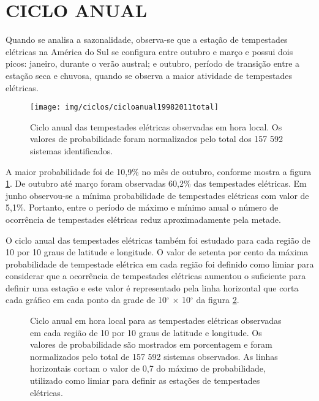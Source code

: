 \section{CICLO ANUAL}
\label{cicloanualsecao}

Quando se analisa a sazonalidade, observa-se que a estação de tempestades elétricas na América do Sul se configura entre outubro e março e possui dois picos: janeiro, durante o verão austral; e outubro, período de transição entre a estação seca e chuvosa, quando se observa a maior atividade de tempestades elétricas. 


\begin{figure}[!h]
\centering
{\texttt{[image: img/ciclos/cicloanual19982011total]}}
\caption{Ciclo anual das tempestades elétricas observadas em hora local. Os valores de probabilidade foram normalizados pelo total dos {157 592} sistemas identificados.}
\label{cicloanualtotal}
\end{figure} 

A maior probabilidade foi de 10,9\%  no mês de outubro, conforme mostra a figura \ref{cicloanualtotal}. De outubro até março foram observadas 60,2\% das tempestades elétricas. Em junho observou-se a mínima probabilidade de tempestades elétricas com valor de 5,1\%. Portanto, entre o período de máximo e mínimo anual o número de ocorrência de tempestades elétricas reduz aproximadamente pela metade.



O ciclo anual das tempestades elétricas também foi estudado para cada região de 10 por 10 graus de latitude e longitude. O valor de setenta por cento da máxima probabilidade de tempestade elétrica em cada região foi definido como limiar para considerar que a ocorrência de tempestades elétricas aumentou o suficiente para definir uma estação e este valor é representado pela linha horizontal que corta cada gráfico em cada ponto da grade de 10$^{\circ}$ $\times$ 10$^{\circ}$ da figura \ref{anual}. 

\begin{figure}[!h]
\caption{Ciclo anual em hora local para as tempestades elétricas observadas em cada região de 10 por 10 graus de latitude e longitude. Os valores de probabilidade são mostrados em porcentagem e foram normalizados pelo total de {157 592} sistemas observados. As linhas horizontais cortam o valor de 0,7 do máximo de probabilidade, utilizado como limiar para definir as estações de tempestades elétricas.}
\label{anual}
\end{figure}

